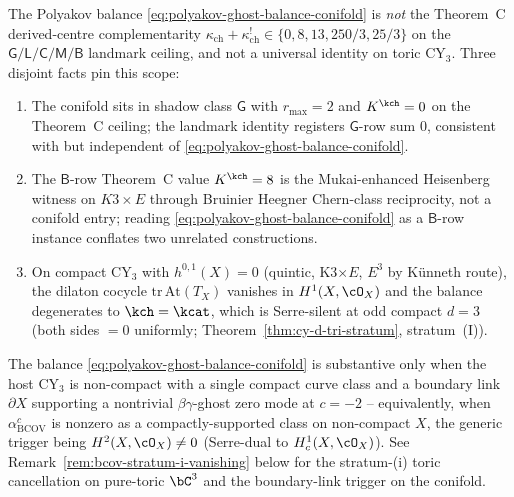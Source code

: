 \begin{remark}
\label{rem:conifold-canonical-row-scope}
The Polyakov balance
\eqref{eq:polyakov-ghost-balance-conifold} is \emph{not} the
Theorem~C derived-centre complementarity
$\kappa_{\mathrm{ch}} + \kappa_{\mathrm{ch}}^! \in \{0, 8, 13, 250/3, 25/3\}$ on the
$\mathsf{G}/\mathsf{L}/\mathsf{C}/\mathsf{M}/\mathsf{B}$ landmark
ceiling, and not a universal identity on toric CY$_3$. Three disjoint
facts pin this scope:
\begin{enumerate}[label=\emph{(\roman*)}]
\item The conifold sits in shadow class $\mathsf G$ with
$r_{\max} = 2$ and $K^{\kch} = 0$ on the Theorem~C ceiling; the
landmark identity registers $\mathsf G$-row sum $0$, consistent
with but independent of \eqref{eq:polyakov-ghost-balance-conifold}.
\item The $\mathsf B$-row Theorem~C value $K^{\kch} = 8$ is the
Mukai-enhanced Heisenberg witness on $K3 \times E$ through Bruinier
Heegner Chern-class reciprocity, not a conifold entry; reading
\eqref{eq:polyakov-ghost-balance-conifold} as a $\mathsf B$-row
instance conflates two unrelated constructions.
\item On compact CY$_3$ with $h^{0,1}(X) = 0$ (quintic, K3$\times E$,
$E^3$ by Künneth route), the dilaton cocycle
$\mathrm{tr}\,\mathrm{At}(T_X)$ vanishes in $H^1(X, \cO_X)$ and the
balance degenerates to $\kch = \kcat$, which is Serre-silent at
odd compact $d = 3$ \textup{(}both sides $= 0$ uniformly;
Theorem~\ref{thm:cy-d-tri-stratum}, stratum~(I)\textup{).}
\end{enumerate}
The balance \eqref{eq:polyakov-ghost-balance-conifold} is substantive
only when the host CY$_3$ is non-compact with a single compact curve
class and a boundary link $\partial X$ supporting a nontrivial
$\beta\gamma$-ghost zero mode at $c = -2$
-- equivalently, when $\alpha^c_{\mathrm{BCOV}}$ is nonzero as a
compactly-supported class on non-compact $X$, the generic trigger
being $H^2(X, \cO_X) \neq 0$ (Serre-dual to $H^1_c(X, \cO_X)$).
See Remark~\ref{rem:bcov-stratum-i-vanishing} below for the
stratum-(i) toric cancellation on pure-toric $\bC^3$ and the
boundary-link trigger on the conifold.
\end{remark}

